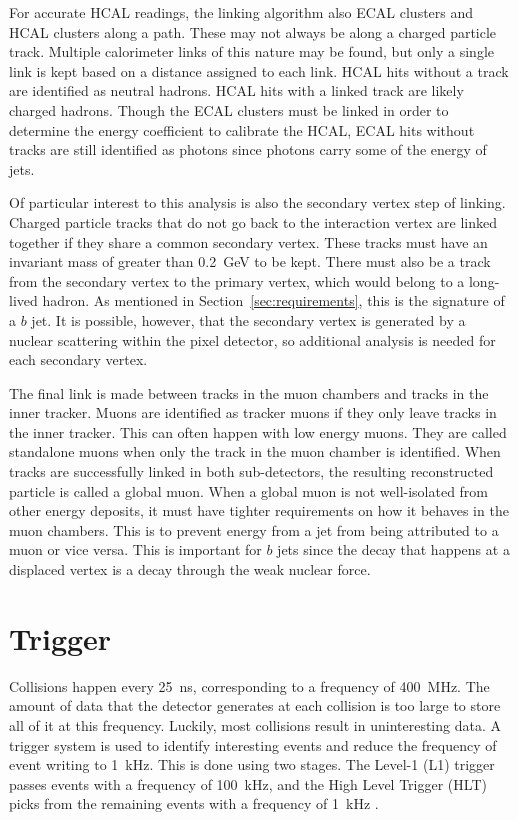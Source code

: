 For accurate HCAL readings,
the linking algorithm also ECAL clusters and HCAL clusters along a path.
These may not always be along a charged particle track.
Multiple calorimeter links of this nature may be found,
but only a single link is kept based on a distance assigned to each link.
HCAL hits without a track are identified as neutral hadrons.
HCAL hits with a linked track are likely charged hadrons.
Though the ECAL clusters must be linked in order to determine the energy
coefficient to calibrate the HCAL,
ECAL hits without tracks are still identified as photons since photons
carry some of the energy of jets.

Of particular interest to this analysis is also the secondary vertex step of linking.
Charged particle tracks that do not go back to the interaction vertex
are linked together if they share a common secondary vertex.
These tracks must have an invariant mass of greater than \SI{0.2}{GeV} to be kept.
There must also be a track from the secondary vertex to the primary vertex,
which would belong to a long-lived hadron.
As mentioned in Section~\ref{sec:requirements}, this is the signature of a $b$ jet.
It is possible, however, that the secondary vertex is generated
by a nuclear scattering within the pixel detector,
so additional analysis is needed for each secondary vertex.

The final link is made between tracks in the muon chambers and tracks in the inner tracker.
Muons are identified as tracker muons if they only leave tracks in the inner tracker.
This can often happen with low energy muons.
They are called standalone muons when only the track in the muon chamber is identified.
When tracks are successfully linked in both sub-detectors,
the resulting reconstructed particle is called a global muon.
When a global muon is not well-isolated from other energy deposits,
it must have tighter requirements on how it behaves in the muon chambers.
This is to prevent energy from a jet from being attributed to a muon or vice versa.
This is important for $b$ jets since the decay that happens at a displaced vertex
is a decay through the weak nuclear force.

\section{Trigger} \label{sec:trigger}

Collisions happen every \SI{25}{ns}, corresponding to a frequency of \SI{400}{MHz}.
The amount of data that the detector generates at each collision is
too large to store all of it at this frequency.
Luckily, most collisions result in uninteresting data.
A trigger system is used to identify interesting events
and reduce the frequency of event writing to \SI{1}{kHz}.
This is done using two stages.
The Level-1 (L1) trigger passes events with a frequency of \SI{100}{kHz},
and the High Level Trigger (HLT) picks from the remaining events
with a frequency of \SI{1}{kHz} \cite{Tosi:2290106}.

